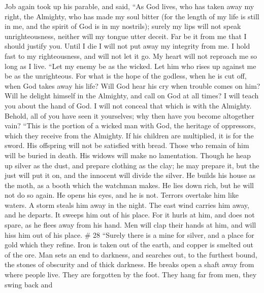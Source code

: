  Job again took up his parable, and said,  ``As
God lives, who has taken away my right, the Almighty, who has made my
soul bitter  (for the length of my life is still in me, and
the spirit of God is in my nostrils);  surely my lips will
not speak unrighteousness, neither will my tongue utter deceit.
 Far be it from me that I should justify you. Until I die I
will not put away my integrity from me.  I hold fast to my
righteousness, and will not let it go. My heart will not reproach me so
long as I live.  ``Let my enemy be as the wicked. Let him
who rises up against me be as the unrighteous.  For what is
the hope of the godless, when he is cut off, when God takes away his
life?  Will God hear his cry when trouble comes on him?
 Will he delight himself in the Almighty, and call on God
at all times?  I will teach you about the hand of God. I
will not conceal that which is with the Almighty.  Behold,
all of you have seen it yourselves; why then have you become altogether
vain?  ``This is the portion of a wicked man with God, the
heritage of oppressors, which they receive from the Almighty.
 If his children are multiplied, it is for the sword. His
offspring will not be satisfied with bread.  Those who
remain of him will be buried in death. His widows will make no
lamentation.  Though he heap up silver as the dust, and
prepare clothing as the clay;  he may prepare it, but the
just will put it on, and the innocent will divide the silver.
 He builds his house as the moth, as a booth which the
watchman makes.  He lies down rich, but he will not do so
again. He opens his eyes, and he is not.  Terrors overtake
him like waters. A storm steals him away in the night.  The
east wind carries him away, and he departs. It sweeps him out of his
place.  For it hurls at him, and does not spare, as he
flees away from his hand.  Men will clap their hands at
him, and will hiss him out of his place. \# 28  ``Surely
there is a mine for silver, and a place for gold which they refine.
 Iron is taken out of the earth, and copper is smelted out
of the ore.  Man sets an end to darkness, and searches out,
to the furthest bound, the stones of obscurity and of thick darkness.
 He breaks open a shaft away from where people live. They
are forgotten by the foot. They hang far from men, they swing back and
